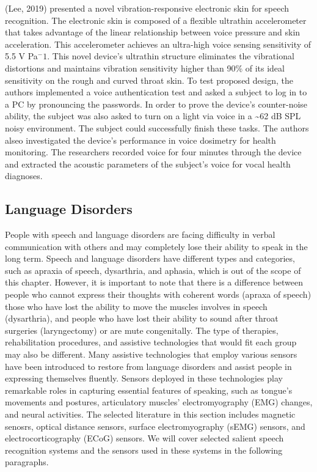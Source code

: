 (Lee, 2019) presented a novel vibration-responsive electronic skin for speech recognition. The electronic skin is composed of a flexible ultrathin accelerometer that takes advantage of the linear relationship between voice pressure and skin acceleration. This accelerometer achieves an ultra-high voice sensing sensitivity of 5.5 V Pa$^-1$. This novel device's ultrathin structure eliminates the vibrational distortions and maintains vibration sensitivity higher than 90\% of its ideal sensitivity on the rough and curved throat skin. To test proposed design, the authors implemented a voice authentication test and asked a subject to log in to a PC by pronouncing the passwords. In order to prove the device's counter-noise ability, the subject was also asked to turn on a light via voice in a \sim 62 dB SPL noisy environment. The subject could successfully finish these tasks. The authors alseo investigated the device's performance in voice dosimetry for health monitoring. The researchers recorded voice for four minutes through the device and extracted the acoustic parameters of the subject's voice for vocal health diagnoses.


\subsection{Language Disorders}
People with speech and language disorders are facing difficulty in verbal communication with others and may completely lose their ability to speak in the long term. Speech and language disorders have different types and categories, such as apraxia of speech, dysarthria, and aphasia, which is out of the scope of this chapter. However, it is important to note that there is a difference between people who cannot express their thoughts with coherent words (apraxa of speech) those who have lost the ability to move the muscles involves in speech (dysarthria), and people who have lost their ability to sound after throat surgeries (laryngectomy) or are mute congenitally. The type of therapies, rehabilitation procedures, and assistive technologies that would fit each group may also be different. Many assistive technologies that employ various sensors have been introduced to restore from language disorders and assist people in expressing themselves fluently. Sensors deployed in these technologies play remarkable roles in capturing essential features of speaking, such as tongue's movements and postures, articulatory muscles' electromyography (EMG) changes, and neural activities. The selected literature in this section includes magnetic senosrs, optical distance sensors, surface electromyography (sEMG) sensors, and electrocorticography (ECoG) sensors. We will cover selected salient speech recognition systems and the sensors used in these systems in the following paragraphs.

